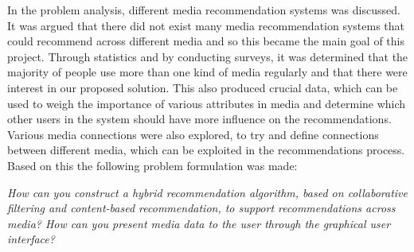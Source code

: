 In the problem analysis, different media recommendation systems was discussed. It was argued that there did not exist many media recommendation systems that could recommend across different media and so this became the main goal of this project. Through statistics and by conducting surveys, it was determined that the majority of people use more than one kind of media regularly and that there were interest in our proposed solution. This also produced crucial data, which can be used to weigh the importance of various attributes in media and determine which other users in the system should have more influence on the recommendations. Various media connections were also explored, to try and define connections between different media, which can be exploited in the recommendations process. Based on this the following problem formulation was made:




\textit{How can you construct a hybrid recommendation algorithm, based on collaborative filtering and content-based recommendation, to support recommendations across media? How can you present media data to the user through the graphical user interface?}

